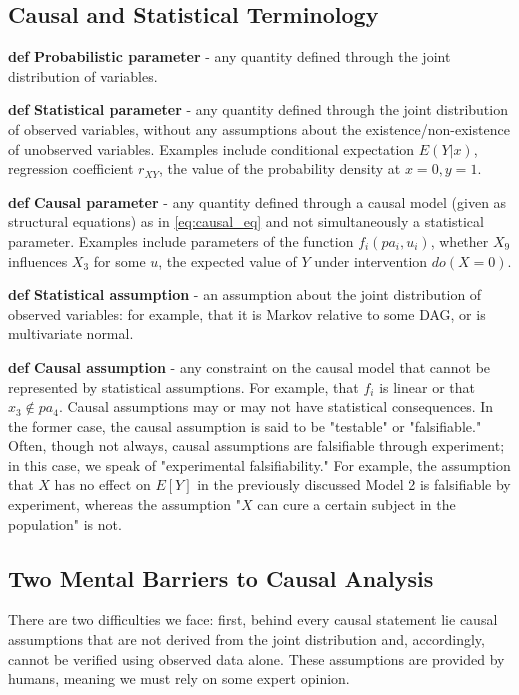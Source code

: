 \documentclass[fleqn]{article}
\def\define#1{\textbf{def} \textbf{#1}}
\numberwithin{equation}{section}
\numberwithin{theorem}{section}
\numberwithin{figure}{section}
\numberwithin{lemma}{section}
\numberwithin{corollary}{section}
\begin{document}
\subsection*{Causal and Statistical Terminology}

\define{Probabilistic parameter} - any quantity defined through the joint distribution of variables.

\define{Statistical parameter} - any quantity defined through the joint distribution of observed variables, without any assumptions about the existence/non-existence of unobserved variables. Examples include conditional expectation $E(Y|x)$, regression coefficient $r_{XY}$, the value of the probability density at $x = 0, y = 1$.

\define{Causal parameter} - any quantity defined through a causal model (given as structural equations) as in \ref{eq:causal_eq} and not simultaneously a statistical parameter. Examples include parameters of the function $f_i(pa_i, u_i)$, whether $X_9$ influences $X_3$ for some $u$, the expected value of $Y$ under intervention $do(X=0)$.

\define{Statistical assumption} - an assumption about the joint distribution of observed variables: for example, that it is Markov relative to some DAG, or is multivariate normal.

\define{Causal assumption} - any constraint on the causal model that cannot be represented by statistical assumptions. For example, that $f_i$ is linear or that $x_3 \notin pa_4$. Causal assumptions may or may not have statistical consequences. In the former case, the causal assumption is said to be "testable" or "falsifiable." Often, though not always, causal assumptions are falsifiable through experiment; in this case, we speak of "experimental falsifiability." For example, the assumption that $X$ has no effect on $E[Y]$ in the previously discussed Model 2 is falsifiable by experiment, whereas the assumption "$X$ can cure a certain subject in the population" is not.

\subsection*{Two Mental Barriers to Causal Analysis}

There are two difficulties we face: first, behind every causal statement lie causal assumptions that are not derived from the joint distribution and, accordingly, cannot be verified using observed data alone. These assumptions are provided by humans, meaning we must rely on some expert opinion.
\end{document}
